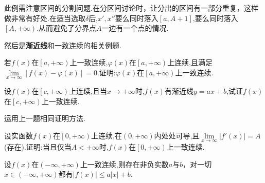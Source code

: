 \begin{note}
	此例需注意区间的分割问题.在分区间讨论时，让分出的区间有一部分重复，这样做非常有好处.在适当选取$\delta $后,$x',x''$要么同时落入$\left[ a,A+1 \right] $,要么同时落入$\left[ \left. A,+\infty \right) \right. $.从而避免了分界点$A$一边有一个点的情况.
\end{note}

\vspace{7cm}

然后是\textbf{渐近线}和一致连续的相关例题.

\begin{example}
	若$f\left( x \right) $在$\left[ a,+\left. \infty \right) \right. $上一致连续,$\varphi \left( x \right) $在$\left[ a,+\left. \infty \right) \right. $上连续,且满足$\lim\limits_{x\rightarrow \infty}\left[ f\left( x \right) -\varphi \right. \left. \left( x \right) \right] =0$.证明:$\varphi \left( x \right) $在$\left[ a,+\left. \infty \right) \right. $上一致连续.
\end{example}

\vspace{6cm}

\begin{example}
	设$f\left( x \right) $在$\left[ c,+\left. \infty \right) \right. $上连续,且当$x\rightarrow +\infty $时,$f\left( x \right) $有渐近线$y=ax+b$,试证$f\left( x \right) $在$\left[ c,+\left. \infty \right) \right. $上一致连续.
\end{example}

\begin{remark}
	运用上一题相同证明方法.
\end{remark}

\vspace{8cm}

\begin{example}
	设实函数$f\left( x \right) $在$\left[ 0,+\left. \infty \right) \right. $上连续,在$\left( 0,+\infty \right) $内处处可导,且$\lim\limits_{x\rightarrow \infty}\left| f'\left( x \right) \right|=A $(存在).证明:当且仅当$A<+\infty $时,$f\left( x \right) $在$\left[ 0,+\left. \infty \right) \right. $上一致连续.
\end{example}

\vspace{8cm}

\begin{example}
	设$f\left( x \right) $在$\left( -\infty ,+\infty \right) $上一致连续,则存在非负实数$a$与$b$，对一切$x\in \left( -\infty ,+\infty \right) $都有$\left| f\left( x \right) \right|\le a\left| x \right|+b$.
\end{example}

